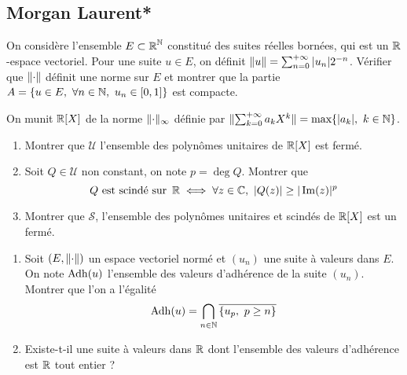 \documentclass[10pt]{scrartcl}
\title{}
\author{}
\date{}
\begin{document}
    \subsection*{Morgan Laurent*}
    \begin{exo}
        On considère l'ensemble $E\subset \operatorname{\mathbb R}^{\operatorname{\mathbb N}}$ constitué des suites réelles bornées, qui est un $\operatorname{\mathbb R}$-espace vectoriel.
        Pour une suite $u\in E$, on définit $\lVert u\rVert=\sum_{n=0}^{+\infty}|u_n|2^{-n}$. Vérifier que $\lVert \cdot\rVert$ définit une norme sur $E$ 
        et montrer que la partie $A=\lbrace u\in E,\ \forall n\in\N,\ u_n\in[0,1]\rbrace$ est compacte.
    \end{exo}

    \begin{exo}
        On munit $\operatorname{\mathbb R}[X]$ de la norme $\lVert \cdot\rVert_{\infty}$ définie par $\lVert \sum_{k=0}^{+\infty}a_kX^k\rVert=\text{max}\lbrace |a_k|,\ k\in\operatorname{\mathbb N}\rbrace$.
        \begin{enumerate}
            \item Montrer que $\mathcal U$ l'ensemble des polynômes unitaires de $\operatorname{\mathbb R}[X]$ est fermé.
            \item Soit $Q\in\mathcal U$ non constant, on note $p=\deg Q$. Montrer que 
            \[Q\text{ est scindé sur }\operatorname{\mathbb R}\iff \forall z\in\operatorname{\mathbb C},\ |Q(z)|\geq |\operatorname{Im}(z)|^p\]
            \item Montrer que $\mathcal S$, l'ensemble des polynômes unitaires et scindés de $\operatorname{\mathbb R}[X]$ est un fermé.
        \end{enumerate}
    \end{exo}

    \begin{exo}
        \hfill
        \begin{enumerate}
            \item Soit $(E,\lVert \cdot\rVert)$ un espace vectoriel normé et $(u_n)$ une suite à valeurs dans $E$.
            On note $\operatorname{Adh}(u)$ l'ensemble des valeurs d'adhérence de la suite $(u_n)$. Montrer que l'on a l'égalité 
            \[
                \Adh(u)=\bigcap_{n\in\N}\overline{\lbrace u_p,\ p\geq n\rbrace}
            \]
            \item Existe-t-il une suite à valeurs dans $\operatorname{\mathbb R}$ dont l'ensemble des valeurs d'adhérence est $\operatorname{\mathbb R}$ tout entier ?
        \end{enumerate}
    \end{exo}
\end{document}
